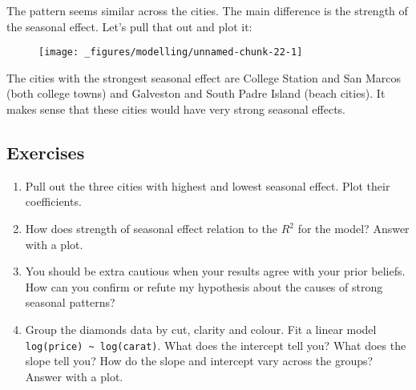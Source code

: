 The pattern seems similar across the cities. The main difference is the
strength of the seasonal effect. Let's pull that out and plot it:

\begin{Shaded}
\end{Shaded}

\begin{figure}[H]
  \centering
  \texttt{[image: \_figures/modelling/unnamed-chunk-22-1]}
\end{figure}

The cities with the strongest seasonal effect are College Station and
San Marcos (both college towns) and Galveston and South Padre Island
(beach cities). It makes sense that these cities would have very strong
seasonal effects.

\subsection{Exercises}

\begin{enumerate}
\def\labelenumi{\arabic{enumi}.}
\item
  Pull out the three cities with highest and lowest seasonal effect.
  Plot their coefficients.
\item
  How does strength of seasonal effect relation to the \(R^2\) for the
  model? Answer with a plot.
\item
  You should be extra cautious when your results agree with your prior
  beliefs. How can you confirm or refute my hypothesis about the causes
  of strong seasonal patterns?
\item
  Group the diamonds data by cut, clarity and colour. Fit a linear model
  \texttt{log(price)\ \textasciitilde{}\ log(carat)}. What does the
  intercept tell you? What does the slope tell you? How do the slope and
  intercept vary across the groups? Answer with a plot.
\end{enumerate}

